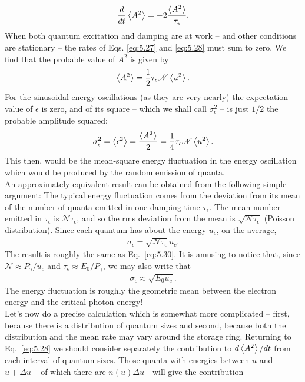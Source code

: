 \begin{align} \label{eq:5.28}
	\dfrac{d}{dt}\left< A^2 \right> = -2 \dfrac{\left< A^2 \right>}{\tau_\epsilon}.
\end{align}
When both quantum excitation and damping are at work -- and other conditions are
stationary -- the rates of Eqs. \eqref{eq:5.27} and \eqref{eq:5.28} must sum to zero. We find that the probable value of $A^2$ is given by
\begin{align}
	\left< A^2 \right> = \dfrac{1}{2} \tau_\epsilon \mathscr{N} \left< u^2 \right>.
\end{align}
For the sinusoidal energy oscillations (as they are very nearly) the expectation value of $\epsilon$ is zero, and of its square -- which we shall call $\sigma_\epsilon^2$ -- is just $1/2$ the probable amplitude squared:
\begin{align}\label{eq:5.30}
	\sigma_\epsilon^2 = \left< \epsilon^2 \right> = \dfrac{\left< A^2 \right>}{2} = \dfrac{1}{4} \tau_\epsilon \mathscr{N} \left< u^2 \right>.
\end{align}
This then, would be the mean-square energy fluctuation in the energy oscillation which would be produced by the random emission of quanta.\\
An approximately equivalent result can be obtained from the following simple argument: The typical energy fluctuation comes from the deviation from its mean of the number of quanta emitted in one damping time $\tau_\epsilon$. The mean number emitted in $\tau_\epsilon$ is $\mathscr{N}\tau_\epsilon$, and so the rms deviation from the mean is $\sqrt{\mathscr{N}\tau_\epsilon}$ (Poisson distribution). Since each quantum has about the energy $u_c$, on the average,
\begin{align}
	\sigma_\epsilon = \sqrt{\mathscr{N}\tau_\epsilon} u_c.
\end{align}
The result is roughly the same as Eq.~\eqref{eq:5.30}. It is amusing to notice that, since $\mathscr{N} \approx P_\gamma/u_c$ and $\tau_\epsilon \approx E_0/P_\gamma$, we may also write that
\begin{align} \label{eq:5.32}
	\sigma_\epsilon \approx \sqrt{E_0 u_c}.
\end{align}
The energy fluctuation is roughly the geometric mean between the electron energy and the critical
 photon energy!\\
Let's now do a precise calculation which is somewhat more complicated -- first, because there is a distribution of quantum sizes and second, because both the distribution and the mean rate may vary around the storage ring. Returning to Eq.~\eqref{eq:5.28} we should consider separately the contribution to $d\left< A^2 \right>/dt$ from each interval of quantum sizes. Those quanta with energies between $u$ and $u + \Delta u$ -- of which there are $n(u)\Delta u$ - will give the contribution
